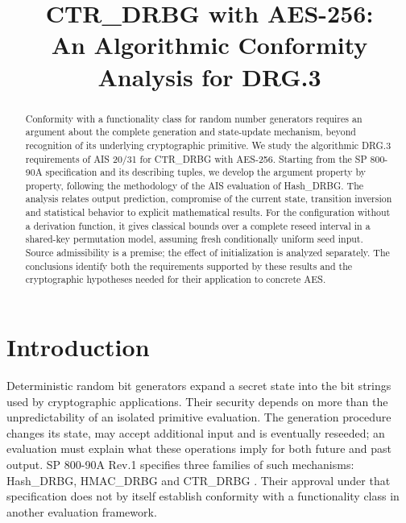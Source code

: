 \documentclass[journal=tosc,preprint,floatrow,nohyperxmp]{iacrtrans}
\title[CTR\_DRBG and the DRG.3 requirements]{CTR\_DRBG with AES-256:\\An Algorithmic Conformity Analysis for DRG.3}
\author{}
\institute{}
\date{}
\newif\ifjordireview
\newcounter{jordinote}
\newcommand{\jordinote}[2]{%
  \ifjordireview
  \stepcounter{jordinote}\par\medskip\noindent
  \fcolorbox{blue!55!black}{blue!4}{%
    \begin{minipage}{\dimexpr\linewidth-2\fboxsep-2\fboxrule\relax}
    \small\raggedright\color{blue!45!black}
    \textbf{Solo Jordi -- J\thejordinote: #1}\par\smallskip
    #2
    \end{minipage}}\par\medskip
  \fi
}
\numberwithin{lemma}{section}
\numberwithin{proposition}{section}
\numberwithin{equation}{section}
\theoremstyle{definition}
\numberwithin{definition}{section}
\theoremstyle{plain}
\begin{document}
\maketitle
\ifjordireview
\begin{center}\small\color{blue!45!black}
\textbf{VERSIÓN DE REVISIÓN PARA JORDI -- COMENTARIOS DE TRABAJO}\\
Los recuadros azules no forman parte del artículo.
\end{center}
\fi
{}
\begin{abstract}
Conformity with a functionality class for random number generators requires an argument about the complete generation and state-update mechanism, beyond recognition of its underlying cryptographic primitive. We study the algorithmic DRG.3 requirements of AIS 20/31 for CTR\_DRBG with AES-256. Starting from the SP 800-90A specification and its describing tuples, we develop the argument property by property, following the methodology of the AIS evaluation of Hash\_DRBG. The analysis relates output prediction, compromise of the current state, transition inversion and statistical behavior to explicit mathematical results. For the configuration without a derivation function, it gives classical bounds over a complete reseed interval in a shared-key permutation model, assuming fresh conditionally uniform seed input. Source admissibility is a premise; the effect of initialization is analyzed separately. The conclusions identify both the requirements supported by these results and the cryptographic hypotheses needed for their application to concrete AES.
\end{abstract}

\jordinote{Qué queremos demostrar}{Jordi: revisa que el objetivo sea el que buscamos: un argumento de conformidad algorítmica DRG.3, con fuente suficiente asumida, siguiendo el recorrido expositivo del ejemplo AIS de Hash\_DRBG. El abstract debe prometer exactamente lo que luego justificamos. Las hipótesis sobre AES y las obligaciones pendientes no deben confundirse con requisitos ya cerrados.}

\section{Introduction}\label{sec:introduction}
Deterministic random bit generators expand a secret state into the bit strings used by cryptographic applications. Their security depends on more than the unpredictability of an isolated primitive evaluation. The generation procedure changes its state, may accept additional input and is eventually reseeded; an evaluation must explain what these operations imply for both future and past output. SP 800-90A Rev.1 specifies three families of such mechanisms: Hash\_DRBG, HMAC\_DRBG and CTR\_DRBG \cite{90a}. Their approval under that specification does not by itself establish conformity with a functionality class in another evaluation framework.
\end{document}
